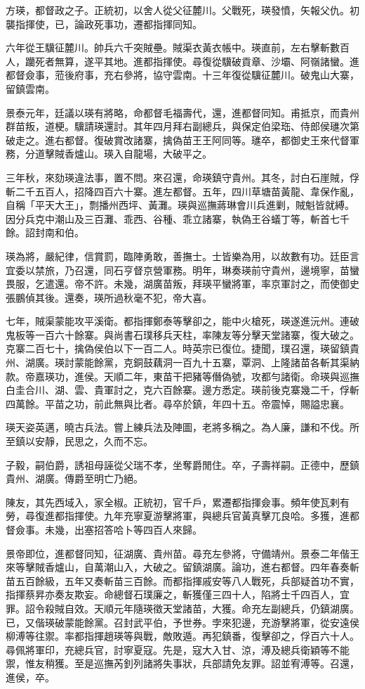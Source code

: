 \begin{pinyinscope}
方瑛，都督政之子。正統初，以舍人從父征麓川。父戰死，瑛發憤，矢報父仇。初襲指揮使，已，論政死事功，遷都指揮同知。

六年從王驥征麓川。帥兵六千突賊壘。賊渠衣黃衣帳中。瑛直前，左右擊斬數百人，躪死者無算，遂平其地。進都指揮使。尋復從驥破貢章、沙壩、阿嶺諸蠻。進都督僉事，蒞後府事，充右參將，協守雲南。十三年復從驥征麓川。破鬼山大寨，留鎮雲南。

景泰元年，廷議以瑛有將略，命都督毛福壽代，還，進都督同知。甫抵京，而貴州群苗叛，道梗。驥請瑛還討。其年四月拜右副總兵，與保定伯梁珤、侍郎侯璡次第破走之。進右都督。復破賞改諸寨，擒偽苗王王阿同等。璡卒，都御史王來代督軍務，分道擊賊香爐山。瑛入自龍場，大破平之。

三年秋，來劾瑛違法事，置不問。來召還，命瑛鎮守貴州。其冬，討白石崖賊，俘斬二千五百人，招降四百六十寨。進左都督。五年，四川草塘苗黃龍、韋保作亂，自稱「平天大王」，剽播州西坪、黃灘。瑛與巡撫蔣琳會川兵進剿，賊魁皆就縛。因分兵克中潮山及三百灘、乖西、谷種、乖立諸寨，執偽王谷蟻丁等，斬首七千餘。詔封南和伯。

瑛為將，嚴紀律，信賞罰，臨陣勇敢，善撫士。士皆樂為用，以故數有功。廷臣言宜委以禁旅，乃召還，同石亨督京營軍務。明年，琳奏瑛前守貴州，邊境寧，苗蠻畏服，乞遣還。帝不許。未幾，湖廣苗叛，拜瑛平蠻將軍，率京軍討之，而使御史張鵬偵其後。還奏，瑛所過秋毫不犯，帝大喜。

七年，賊渠蒙能攻平溪衛。都指揮鄭泰等擊卻之，能中火槍死，瑛遂進沅州。連破鬼板等一百六十餘寨。與尚書石璞移兵天柱，率陳友等分擊天堂諸寨，復大破之。克寨二百七十，擒偽侯伯以下一百二人。時英宗已復位。捷聞，璞召還，瑛留鎮貴州、湖廣。瑛討蒙能餘黨，克銅鼓藕洞一百九十五寨，覃洞、上隆諸苗各斬其渠納款。帝嘉瑛功，進侯。天順二年，東苗干把豬等僭偽號，攻都勻諸衛。命瑛與巡撫白圭合川、湖、雲、貴軍討之，克六百餘寨。邊方悉定。瑛前後克寨幾二千，俘斬四萬餘。平苗之功，前此無與比者。尋卒於鎮，年四十五。帝震悼，賜謚忠襄。

瑛天姿英邁，曉古兵法。嘗上練兵法及陣圖，老將多稱之。為人廉，謙和不伐。所至鎮以安靜，民思之，久而不忘。

子毅，嗣伯爵，誘祖母誣從父瑞不孝，坐奪爵閒住。卒，子壽祥嗣。正德中，歷鎮貴州、湖廣。傳爵至明亡乃絕。

陳友，其先西域入，家全椒。正統初，官千戶，累遷都指揮僉事。頻年使瓦剌有勞，尋復進都指揮使。九年充寧夏游擊將軍，與總兵官黃真擊兀良哈。多獲，進都督僉事。未幾，出塞招答哈卜等四百人來歸。

景帝即位，進都督同知，征湖廣、貴州苗。尋充左參將，守備靖州。景泰二年偕王來等擊賊香爐山，自萬潮山入，大破之。留鎮湖廣。論功，進右都督。四年春奏斬苗五百餘級，五年又奏斬苗三百餘。而都指揮戚安等八人戰死，兵部疑首功不實，指揮蔡昇亦奏友欺妄。命總督石璞廉之，斬獲僅三四十人，陷將士千四百人，宜罪。詔令殺賊自效。天順元年隨瑛徵天堂諸苗，大獲。命充左副總兵，仍鎮湖廣。已，又偕瑛破蒙能餘黨。召封武平伯，予世券。孛來犯邊，充游擊將軍，從安遠侯柳溥等往禦。率都指揮趙瑛等與戰，敵敗遁。再犯鎮番，復擊卻之，俘百六十人。尋佩將軍印，充總兵官，討寧夏寇。先是，寇大入甘、涼，溥及總兵衛穎等不能禦，惟友稍獲。至是巡撫芮釗列諸將失事狀，兵部請免友罪。詔並宥溥等。召還，進侯，卒。


\end{pinyinscope}
